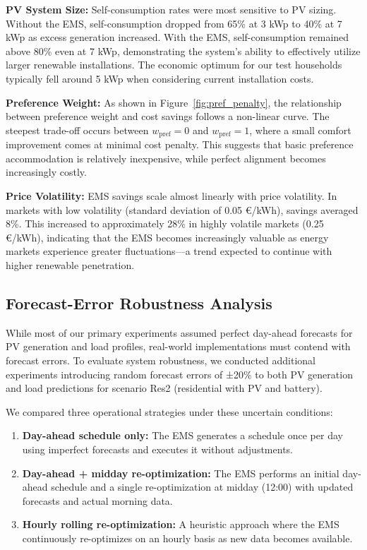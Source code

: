 \documentclass[12pt,a4paper]{article}
\begin{document}
\textbf{PV System Size:} Self-consumption rates were most sensitive to PV sizing. Without the EMS, self-consumption dropped from 65\% at 3 kWp to 40\% at 7 kWp as excess generation increased. With the EMS, self-consumption remained above 80\% even at 7 kWp, demonstrating the system's ability to effectively utilize larger renewable installations. The economic optimum for our test households typically fell around 5 kWp when considering current installation costs.

\textbf{Preference Weight:} As shown in Figure~\ref{fig:pref_penalty}, the relationship between preference weight and cost savings follows a non-linear curve. The steepest trade-off occurs between $w_{\text{pref}}=0$ and $w_{\text{pref}}=1$, where a small comfort improvement comes at minimal cost penalty. This suggests that basic preference accommodation is relatively inexpensive, while perfect alignment becomes increasingly costly.

\textbf{Price Volatility:} EMS savings scale almost linearly with price volatility. In markets with low volatility (standard deviation of 0.05 €/kWh), savings averaged 8\%. This increased to approximately 28\% in highly volatile markets (0.25 €/kWh), indicating that the EMS becomes increasingly valuable as energy markets experience greater fluctuations—a trend expected to continue with higher renewable penetration.

\subsection{Forecast-Error Robustness Analysis}

While most of our primary experiments assumed perfect day-ahead forecasts for PV generation and load profiles, real-world implementations must contend with forecast errors. To evaluate system robustness, we conducted additional experiments introducing random forecast errors of ±20\% to both PV generation and load predictions for scenario Res2 (residential with PV and battery).

We compared three operational strategies under these uncertain conditions:

\begin{enumerate}
    \item \textbf{Day-ahead schedule only:} The EMS generates a schedule once per day using imperfect forecasts and executes it without adjustments.
    \item \textbf{Day-ahead + midday re-optimization:} The EMS performs an initial day-ahead schedule and a single re-optimization at midday (12:00) with updated forecasts and actual morning data.
    \item \textbf{Hourly rolling re-optimization:} A heuristic approach where the EMS continuously re-optimizes on an hourly basis as new data becomes available.
\end{enumerate}
\end{document}
